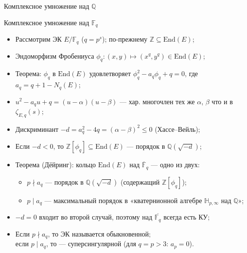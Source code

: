 \documentclass[serif, aspectratio=169]{beamer}
\begin{document}
\begin{frame}{Комплексное умножение над $\mathbb{Q}$}
\begin{itemize}
    \end{itemize}
    \note{
        \begin{itemize}
            \item ---
        \end{itemize}
    }
\end{frame}

\begin{frame}{Комплексное умножение над $\mathbb{F}_q$}
    \begin{itemize}
        \item Рассмотрим ЭК $E/\mathbb{F}_q$ ($q=p^s$); по-прежнему $\mathbb{Z}\subseteq\mathrm{End}(E)$;
        \item Эндоморфизм Фробениуса $\phi_q:(x,y)\mapsto(x^q,y^q)\in\mathrm{End}(E)$;
        \item Теорема: $\phi_q$ в $\mathrm{End}(E)$ удовлетворяет $\phi_q^2-a_q\phi_q+q=0$, где $a_q=q+1-N_q(E)$;
        \item $u^2-a_qu+q=(u-\alpha)(u-\beta)$ --- хар. многочлен тех же $\alpha$, $\beta$ что и в $\zeta_{E,q}(s)$;
        \item Дискриминант $-d=a_q^2-4q=(\alpha-\beta)^2\le0$ (Хассе--Вейль);
        \item Если $-d<0$, то $\mathbb{Z}[\phi_q]\subseteq\mathrm{End}(E)$ --- порядок в $\mathbb{Q}(\sqrt{-d})$;
        \item Теорема (Дёйринг): кольцо $\mathrm{End}(E)$ над $\overline{\mathbb{F}}_q$ --- одно из двух:
        \begin{itemize}
            \item $p\nmid a_q$ --- порядок в $\mathbb{Q}(\sqrt{-d})$ (содержащий $\mathbb{Z}[\phi_q]$);
            \item $p\mid a_q$ --- максимальный порядок в «кватернионной алгебре $\mathbb{H}_{p,\infty}$ над $\mathbb{Q}$»;
        \end{itemize}
        \item $-d=0$ входит во второй случай, поэтому над $\overline{\mathbb{F}_q}$ всегда есть КУ;
        \item Если $p\nmid a_q$, то ЭК называется обыкновенной;\\ если $p\mid a_q$, то --- суперсингулярной (для $q=p>3$: $a_p=0$).

\end{itemize}
\end{frame}
\end{document}
